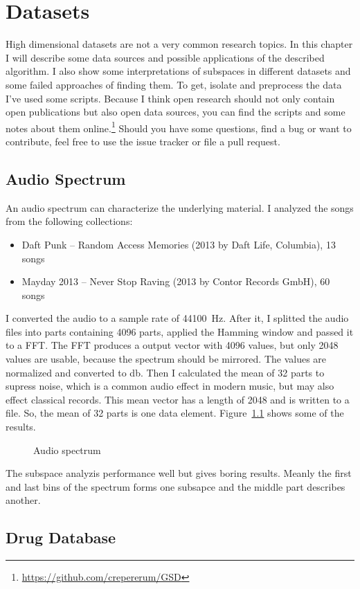 \documentclass[%
	fontsize=11pt,%
	paper=a4,%
	pagesize,%
	twoside=false,%
	listof=totoc,%
	draft%
]{scrbook}
\newcommand*\circled[1]{\tikz[baseline={($(char.base) - (0,0.5pt)$)}]{
	\node[shape=circle,draw,inner sep=0.5pt,font=\scriptsize,thick] (char) {\textsf{#1}};}}
\begin{document}
\chapter{Datasets}
High dimensional datasets are not a very common research topics. In this chapter I will describe some data sources and possible applications of the described algorithm. I also show some interpretations of subspaces in different datasets and some failed approaches of finding them. To get, isolate and preprocess the data I've used some scripts. Because I think open research should not only contain open publications but also open data sources, you can find the scripts and some notes about them online.\footnote{\url{https://github.com/crepererum/GSD}} Should you have some questions, find a bug or want to contribute, feel free to use the issue tracker or file a pull request.

\section{Audio Spectrum}
An audio spectrum can characterize the underlying material. I analyzed the songs from the following collections:
\begin{itemize}
	\item Daft Punk -- Random Access Memories (\circled{P}2013 by Daft Life, Columbia), \num{13} songs
	\item Mayday 2013 -- Never Stop Raving (\circled{C}2013 by Contor Records GmbH), \num{60} songs
\end{itemize}
I converted the audio to a sample rate of \SI{44100}{\hertz}. After it, I splitted the audio files into parts containing \num{4096} parts, applied the Hamming window and passed it to a FFT. The FFT produces a output vector with \num{4096} values, but only \num{2048} values are usable, because the spectrum should be mirrored. The values are normalized and converted to \si{\decibel}. Then I calculated the mean of \num{32} parts to supress noise, which is a common audio effect in modern music, but may also effect classical records. This mean vector has a length of \num{2048} and is written to a file. So, the mean of \num{32} parts is one data element. Figure~\ref{fig:audio} shows some of the results.
\begin{figure}
	
	\caption{Audio spectrum}
	\label{fig:audio}
\end{figure}

The subspace analyzis performance well but gives boring results. Meanly the first and last bins of the spectrum forms one subsapce and the middle part describes another.

\section{Drug Database}


\appendix


\backmatter

\listoffigures

\printglossaries

\cleardoublepage
{}
{}
\printbibliography
\end{document}
